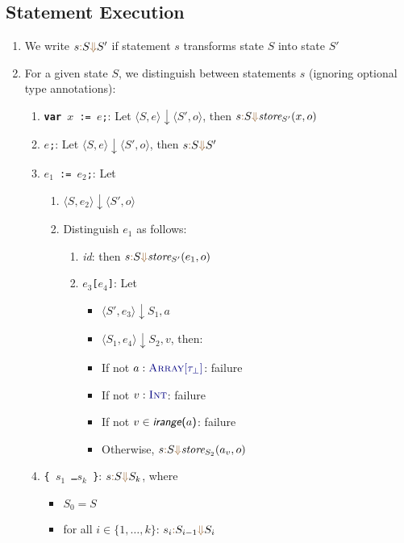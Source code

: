 \documentclass{article}
\newcommand{\tuple}[1]{\ensuremath{\langle #1 \rangle}}
\newcommand{\vterminal}[1]{\textsf{\textcolor{dgreen}{\texttt{#1}}}}
\newcommand{\Ty}[1]{\textcolor{dblue}{#1}}
\newcommand{\Ckw}[1]{{\textsf{\textbf{#1}}}}
\newcommand{\TInt}{\Ty{\textsc{Int}}}
\newcommand{\TArrayof}[1]{\Ty{\textsc{Array}[#1]}}
\newcommand{\arrayindices}[1]{\textsf{\textit{irange}(#1)}}
\newcommand{\failure}{\textcolor{dred}{failure}}
\newcommand{\SEVAL}[3]{#1\textcolor{dorange}{:} #2\textcolor{dorange}{\Downarrow}#3}
\begin{document}
\subsection{Statement Execution}
\begin{enumerate}
\item We write $\SEVAL{s}{S}{S'}$ if statement $s$ transforms state $S$ into state $S'$
\item For a given state $S$, we distinguish between statements $s$ (ignoring optional type annotations):
  \begin{enumerate}
    \item \vterminal{\Ckw{var} $x$ := $e$;}: Let $\tuple{S, e} \downarrow \tuple{S', o}$, then $\SEVAL{s}{S}{\textit{store}_{S'}(x, o)}$
    \item \vterminal{$e$;}: Let $\tuple{S, e} \downarrow \tuple{S', o}$, then $\SEVAL{s}{S}{S'}$
    \item \vterminal{$e_1$ := $e_2$;}: Let
      \begin{enumerate}
      \item $\tuple{S, e_2} \downarrow \tuple{S', o}$
      \item Distinguish $e_1$ as follows:
        \begin{enumerate}
          \item \textit{id}: then $\SEVAL{s}{S}{\textit{store}_{S'}(e_1, o)}$
          \item \vterminal{$e_3$[$e_4$]}: Let
            \begin{itemize}
            \item $\tuple{S', e_3} \downarrow {S_1, a}$
            \item $\tuple{S_1, e_4} \downarrow {S_2, v}$, then:
            \item If not $a : \TArrayof{\tau_\bot}$: \failure
            \item If not $v : \TInt$: \failure
            \item If not $v \in \arrayindices{$a$}$: \failure
            \item Otherwise, $\SEVAL{s}{S}{\textit{store}_{S_2}(a_v, o)}$
            \end{itemize}
        \end{enumerate}
      \end{enumerate}
    \item \vterminal{\{ $s_1$ \ldots $s_k$ \}}: $\SEVAL{s}{S}{S_k}$, where
      \begin{itemize}
        \item $S_0 = S$
        \item for all $i \in \{1, \ldots, k\}$: $\SEVAL{s_i}{S_{i-1}}{S_i}$

\end{itemize}
\end{enumerate}
\end{enumerate}
\end{document}
